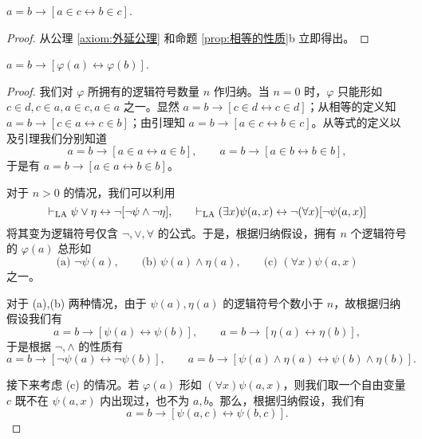 \begin{lemma}
  \(a=b\to[a\in c\leftrightarrow b\in c]\).
\end{lemma}
\begin{proof}
  从公理 \ref{axiom:外延公理} 和命题 \ref{prop:相等的性质}b 立即得出。
\end{proof}

\begin{theorem}
  \(a=b\to[\varphi(a)\leftrightarrow \varphi(b)]\).
\end{theorem}
\begin{proof}
  我们对 \(\varphi\) 所拥有的逻辑符号数量 \(n\) 作归纳。当 \(n=0\) 时，\(\varphi\) 只能形如 \(c\in d,c\in a,a\in c,a\in a\) 之一。显然 \(a=b\to[c\in d\leftrightarrow c\in d]\)；从相等的定义知 \(a=b\to[c\in a\leftrightarrow c\in b]\)；由引理知 \(a=b\to[a\in c\leftrightarrow b\in c]\)。从等式的定义以及引理我们分别知道
  \begin{equation*}
    a=b\to[a\in a\leftrightarrow a\in b],\qquad 
    a=b\to[a\in b\leftrightarrow b\in b],
  \end{equation*}
  于是有 \(a=b\to[a\in a\leftrightarrow b\in b]\)。

  对于 \(n>0\) 的情况，我们可以利用
  \begin{equation*}
    \vdash_{\text{LA}} \psi\lor\eta\leftrightarrow \lnot[\lnot\psi\land\lnot\eta],\qquad
    \vdash_{\text{LA}} (\exists x)\psi(a,x)\leftrightarrow \lnot(\forall x)[\lnot\psi(a,x)]
  \end{equation*}
  将其变为逻辑符号仅含 \(\lnot,\lor,\forall\) 的公式。于是，根据归纳假设，拥有 \(n\) 个逻辑符号的 \(\varphi(a)\) 总形如
  \begin{equation*}
    \text{(a) }\lnot\psi(a),\qquad
    \text{(b) }\psi(a)\land\eta(a),\qquad 
    \text{(c) }(\forall x)\psi(a,x)
  \end{equation*}
  之一。

  对于 (a),(b) 两种情况，由于 \(\psi(a),\eta(a)\) 的逻辑符号个数小于 \(n\)，故根据归纳假设我们有
  \begin{equation*}
    a=b\rightarrow [\psi(a)\leftrightarrow\psi(b)],\qquad
    a=b\rightarrow [\eta(a)\leftrightarrow\eta(b)],
  \end{equation*}
  于是根据 \(\lnot,\land\) 的性质有
  \begin{equation*}
    a=b\rightarrow [\lnot\psi(a)\leftrightarrow\lnot\psi(b)],\qquad
    a=b\rightarrow [\psi(a)\land\eta(a)\leftrightarrow\psi(b)\land\eta(b)].
  \end{equation*}

  接下来考虑 (c) 的情况。若 \(\varphi(a)\) 形如 \((\forall x)\psi(a,x)\)，则我们取一个自由变量 \(c\) 既不在 \(\psi(a,x)\) 内出现过，也不为 \(a,b\)。那么，根据归纳假设，我们有
  \begin{equation*}
    a=b\rightarrow [\psi(a,c)\leftrightarrow\psi(b,c)].
  \end{equation*}


\end{proof}
